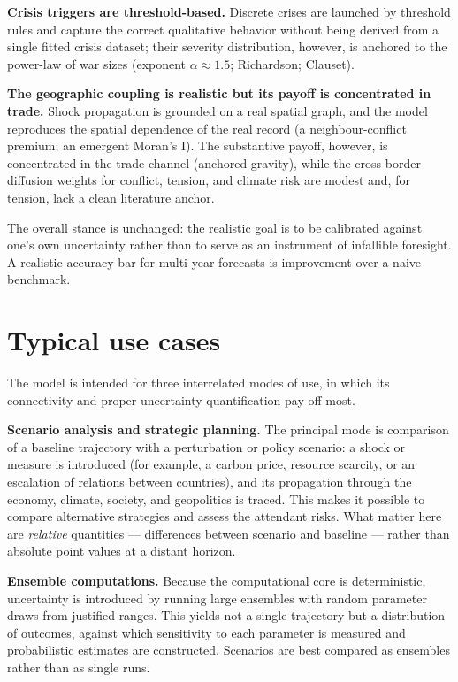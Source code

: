 \documentclass[11pt,a4paper]{article}
\begin{document}
\textbf{Crisis triggers are threshold-based.} Discrete crises are launched by threshold rules and
capture the correct qualitative behavior without being derived from a single fitted crisis dataset;
their severity distribution, however, is anchored to the power-law of war sizes (exponent
${\alpha}{\approx}1.5$; Richardson; Clauset).

\textbf{The geographic coupling is realistic but its payoff is concentrated in trade.} Shock
propagation is grounded on a real spatial graph, and the model reproduces the spatial dependence of the
real record (a neighbour-conflict premium; an emergent Moran's I). The substantive payoff, however, is
concentrated in the trade channel (anchored gravity), while the cross-border diffusion weights for
conflict, tension, and climate risk are modest and, for tension, lack a clean literature anchor.

The overall stance is unchanged: the realistic goal is to be calibrated against one's own
uncertainty rather than to serve as an instrument of infallible foresight. A realistic accuracy bar
for multi-year forecasts is improvement over a naive benchmark.

\section{Typical use cases}
\label{sec:scenarios}

The model is intended for three interrelated modes of use, in which its connectivity and proper
uncertainty quantification pay off most.

\textbf{Scenario analysis and strategic planning.} The principal mode is comparison of a baseline
trajectory with a perturbation or policy scenario: a shock or measure is introduced (for example, a
carbon price, resource scarcity, or an escalation of relations between countries), and its
propagation through the economy, climate, society, and geopolitics is traced. This makes it possible
to compare alternative strategies and assess the attendant risks. What matter here are
\emph{relative} quantities --- differences between scenario and baseline --- rather than absolute
point values at a distant horizon.

\textbf{Ensemble computations.} Because the computational core is deterministic, uncertainty is
introduced by running large ensembles with random parameter draws from justified ranges. This yields
not a single trajectory but a distribution of outcomes, against which sensitivity to each parameter
is measured and probabilistic estimates are constructed. Scenarios are best compared as ensembles
rather than as single runs.
\end{document}
